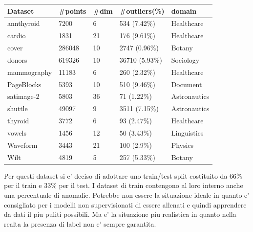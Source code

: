 \begin{table}[]
\begin{tabular}{|l|l|l|l|l|}
\hline
\textbf{Dataset} & \textbf{\#points} & \textbf{\#dim} & \textbf{\#outliers(\%)} & \textbf{domain} \\ \hline
annthyroid       & 7200              & 6              & 534 (7.42\%)            & Healthcare      \\ \hline
cardio           & 1831              & 21             & 176 (9.61\%)            & Healthcare      \\ \hline
cover            & 286048            & 10             & 2747 (0.96\%)           & Botany          \\ \hline
donors           & 619326            & 10             & 36710 (5.93\%)          & Sociology       \\ \hline
mammography      & 11183             & 6              & 260 (2.32\%)            & Healthcare      \\ \hline
PageBlocks       & 5393              & 10             & 510 (9.46\%)            & Document        \\ \hline
satimage-2       & 5803              & 36             & 71 (1.22\%)             & Astronautics    \\ \hline
shuttle          & 49097             & 9              & 3511 (7.15\%)           & Astronautics    \\ \hline
thyroid          & 3772              & 6              & 93 (2.47\%)             & Healthcare      \\ \hline
vowels           & 1456              & 12             & 50 (3.43\%)             & Linguistics     \\ \hline
Waveform         & 3443              & 21             & 100 (2.9\%)             & Physics         \\ \hline
Wilt             & 4819              & 5              & 257 (5.33\%)            & Botany          \\ \hline
\end{tabular}
\end{table}

Per questi dataset si e' deciso di adottare uno train/test split costituito da 66\% per il train e 33\% per il test. I dataset di train contengono al loro interno anche una percentuale di anomalie. Potrebbe non essere la situazione ideale in quanto e' consigliato per i modelli non supervisionati di essere allenati e quindi apprendere da dati il piu puliti possibili. Ma e' la situazione piu realistica in quanto nella realta la presenza di label non e' sempre garantita.  

